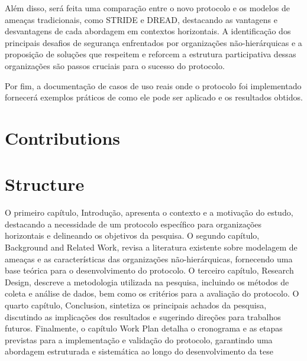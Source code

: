Além disso, será feita uma comparação entre o novo protocolo e os modelos de
ameaças tradicionais, como STRIDE e DREAD, destacando as vantagens e desvantagens de
cada abordagem em contextos horizontais. A identificação dos principais desafios de
segurança enfrentados por organizações não-hierárquicas e a proposição de soluções
que respeitem e reforcem a estrutura participativa dessas organizações são passos
cruciais para o sucesso do protocolo.

Por fim, a documentação de casos de uso reais onde o protocolo foi
implementado fornecerá exemplos práticos de como ele pode ser aplicado e os resultados
obtidos.


\section{Contributions}
\label{sec:contributions}

\section{Structure}
\label{sec:structure}

O primeiro capítulo, Introdução, apresenta o contexto e a motivação do estudo,
destacando a necessidade de um protocolo específico para organizações
horizontais e delineando os objetivos da pesquisa. O segundo
capítulo, Background and Related Work, revisa a literatura existente
sobre modelagem de ameaças e as características das organizações não-hierárquicas,
fornecendo uma base teórica para o desenvolvimento do protocolo. O terceiro capítulo,
Research Design, descreve a metodologia utilizada na pesquisa, incluindo os métodos de
coleta e análise de dados, bem como os critérios para a avaliação do protocolo. O
quarto capítulo, Conclusion, sintetiza os principais achados da pesquisa, discutindo
as implicações dos resultados e sugerindo direções para trabalhos futuros.
Finalmente, o capítulo Work Plan detalha o cronograma e as etapas previstas para a
implementação e validação do protocolo, garantindo uma abordagem estruturada e sistemática
ao longo do desenvolvimento da tese
